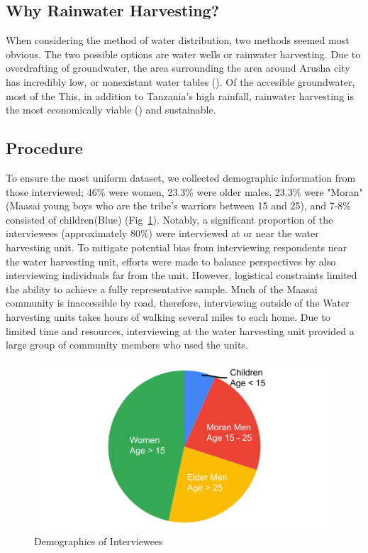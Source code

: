 \documentclass[10pt, twocolumn]{article}
\begin{document}
\subsection{Why Rainwater Harvesting?}

When considering the method of water distribution, two methods seemed most obvious. The two possible options are water wells or rainwater harvesting. Due to overdrafting of groundwater, the area surrounding the area around Arusha city has incredibly low, or nonexistant water tables (\autocite{Ongor2007}). Of the accesible groundwater, most of the This, in addition to Tanzania's high rainfall, rainwater harvesting is the most economically viable (\autocite{TZ_Water_Harvesting}) and sustainable.



\subsection{Procedure}

To ensure the most uniform dataset, we collected demographic information from those interviewed; 46\% were women, 23.3\% were older males, 23.3\% were "Moran" (Maasai young boys who are the tribe’s warriors between 15 and 25), and 7-8\% consisted of children(Blue) (Fig~\ref{fig:demographics}). Notably, a significant proportion of the interviewees (approximately 80\%) were interviewed at or near the water harvesting unit. To mitigate potential bias from interviewing respondents near the water harvesting unit, efforts were made to balance perspectives by also interviewing individuals far from the unit. However, logistical constraints limited the ability to achieve a fully representative sample. Much of the Maasai community is inaccessible by road, therefore, interviewing outside of the Water harvesting units takes hours of walking several miles to each home. Due to limited time and resources, interviewing at the water harvesting unit provided a large group of community members who used the units.

\begin{figure} [H]
    \centering
    \includegraphics[width=1\linewidth]{photos/demographic_split.png}
    \caption{Demographics of Interviewees}
    \label{fig:demographics}
\end{figure}
\end{document}
